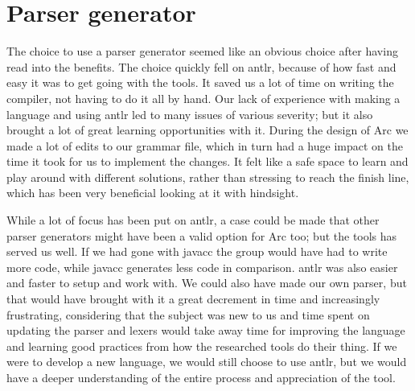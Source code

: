 \section{Parser generator}\label{sec:discussion_parserGenerator}

The choice to use a parser generator seemed like an obvious choice after having read into the benefits. The choice quickly fell on \gls{antlr}, because of how fast and easy it was to get going with the tools. It saved us a lot of time on writing the compiler, not having to do it all by hand. Our lack of experience with making a language and using \gls{antlr} led to many issues of various severity; but it also brought a lot of great learning opportunities with it. During the design of Arc we made a lot of edits to our grammar file, which in turn had a huge impact on the time it took for us to implement the changes. It felt like a safe space to learn and play around with different solutions, rather than stressing to reach the finish line, which has been very beneficial looking at it with hindsight.

While a lot of focus has been put on \gls{antlr}, a case could be made that other parser generators might have been a valid option for Arc too; but the tools has served us well. If we had gone with \gls{javacc} the group would have had to write more code, while \gls{javacc} generates less code in comparison. \gls{antlr} was also easier and faster to setup and work with. We could also have made our own parser, but that would have brought with it a great decrement in time and increasingly frustrating, considering that the subject was new to us and time spent on updating the parser and lexers would take away time for improving the language and learning good practices from how the researched tools do their thing. If we were to develop a new language, we would still choose to use \gls{antlr}, but we would have a deeper understanding of the entire process and appreciation of the tool.


